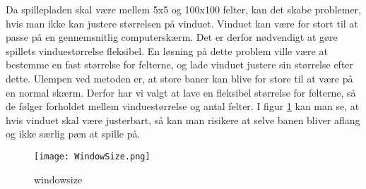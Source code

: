 Da spillepladen skal være mellem 5x5 og 100x100 felter, kan det skabe problemer, hvis man ikke kan justere størrelsen på vinduet. Vinduet kan være for stort til at passe på en gennemsnitlig computerskærm. Det er derfor nødvendigt at gøre spillets vinduestørrelse fleksibel. En løsning på dette problem ville være at bestemme en fast størrelse for felterne, og lade vinduet justere sin størrelse efter dette. Ulempen ved metoden er, at store baner kan blive for store til at være på en normal skærm. Derfor har vi valgt at lave en fleksibel størrelse for felterne, så de følger forholdet mellem vinduestørrelse og antal felter.
I figur \ref{fig:windowsize} kan man se, at hvis vinduet skal være justerbart, så kan man risikere at selve banen bliver aflang og ikke særlig pæn at spille på.

\begin{figure}[h]
	\centering
	\graphicspath{ {pics/} }
	\texttt{[image: WindowSize.png]}
	\label{fig:windowsize}
	\caption{windowsize}
\end{figure}
